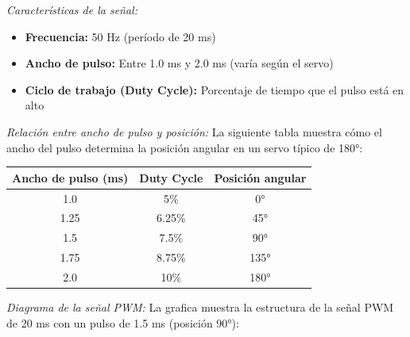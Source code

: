 \documentclass[letterpaper,12pt]{article}
\begin{document}
    \textit{Características de la señal:}
    \begin{itemize}
        \item \textbf{Frecuencia:} 50 Hz (período de 20 ms)
        \item \textbf{Ancho de pulso:} Entre 1.0 ms y 2.0 ms (varía según el servo)
        \item \textbf{Ciclo de trabajo (Duty Cycle):} Porcentaje de tiempo que el pulso está en alto
    \end{itemize}

    \textit{Relación entre ancho de pulso y posición:} La siguiente tabla muestra cómo el ancho del pulso determina la posición angular en un servo típico de 180°:

    \begin{center}
    \begin{tabular}{|c|c|c|}
    \hline
    \textbf{Ancho de pulso (ms)} & \textbf{Duty Cycle} & \textbf{Posición angular} \\
    \hline
    1.0 & 5\% & 0° \\
    \hline
    1.25 & 6.25\% & 45° \\
    \hline
    1.5 & 7.5\% & 90° \\
    \hline
    1.75 & 8.75\% & 135° \\
    \hline
    2.0 & 10\% & 180° \\
    \hline
    \end{tabular}
    \end{center}

    \textit{Diagrama de la señal PWM:} La grafica muestra la estructura de la señal PWM de 20 ms con un pulso de 1.5 ms (posición 90°):

    \begin{center}
    \end{center}
\end{document}
